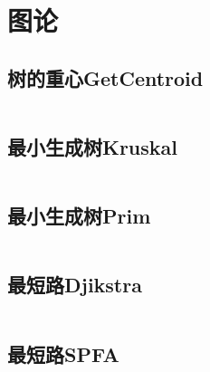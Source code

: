 \documentclass[10pt,a4paper]{ctexart}
\renewcommand{\_}{\textscale{1}{\textunderscore}}
\renewcommand{\_}{\textscale{1}{\textunderscore}}
\begin{document}
\title{}
\author {Leachim}
\maketitle

\begin{figure}[htbp]
\end{figure}

\newpage

\tableofcontents

\newpage
\section{图论}
\subsection{树的重心Get\_Centroid}
\inputminted{c++}{../图论/树的重心Get_Centroid.cpp}
\subsection{最小生成树Kruskal}
\inputminted{c++}{../图论/最小生成树Kruskal.cpp}
\subsection{最小生成树Prim}
\inputminted{c++}{../图论/最小生成树Prim.cpp}
\subsection{最短路Djikstra}
\inputminted{c++}{../图论/最短路Djikstra.cpp}
\subsection{最短路SPFA}
\inputminted{c++}{../图论/最短路SPFA.cpp}
\end{document}

